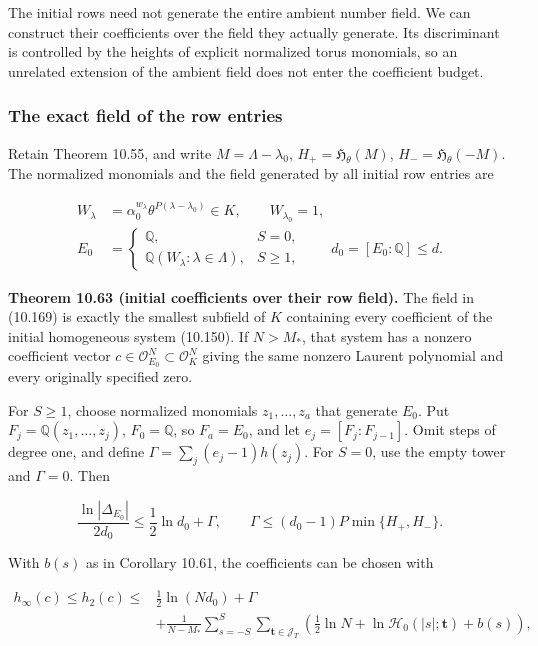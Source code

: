 \documentclass[
  11pt,
  a4paper,
]{article}
\begin{document}
The initial rows need not generate the entire ambient number field. We
can construct their coefficients over the field they actually generate.
Its discriminant is controlled by the heights of explicit normalized
torus monomials, so an unrelated extension of the ambient field does not
enter the coefficient budget.

\subsubsection{The exact field of the row
entries}\label{the-exact-field-of-the-row-entries}

Retain Theorem 10.55, and write \(M=\Lambda-\lambda_0\),
\(H_+=\mathfrak H_\theta(M)\), \(H_-=\mathfrak H_\theta(-M)\). The
normalized monomials and the field generated by all initial row entries
are

\[
\begin{aligned}
W_\lambda&=\alpha_0^{w_\lambda}\theta^{P(\lambda-\lambda_0)}
\in K,\qquad W_{\lambda_0}=1,\\
E_0&=\begin{cases}
\mathbb Q,&S=0,\\
\mathbb Q(W_\lambda:\lambda\in\Lambda),&S\ge1,
\end{cases}
\qquad d_0=[E_0:\mathbb Q]\le d.
\end{aligned}
\tag{10.169}
\]

\textbf{Theorem 10.63 (initial coefficients over their row field).} The
field in (10.169) is exactly the smallest subfield of \(K\) containing
every coefficient of the initial homogeneous system (10.150). If
\(N>M_*\), that system has a nonzero coefficient vector
\(c\in\mathcal O_{E_0}^N\subset\mathcal O_K^N\) giving the same nonzero
Laurent polynomial and every originally specified zero.

For \(S\ge1\), choose normalized monomials \(z_1,\ldots,z_a\) that
generate \(E_0\). Put \(F_j=\mathbb Q(z_1,\ldots,z_j)\),
\(F_0=\mathbb Q\), so \(F_a=E_0\), and let \(e_j=[F_j:F_{j-1}]\). Omit
steps of degree one, and define \(\Gamma=\sum_j(e_j-1)h(z_j)\). For
\(S=0\), use the empty tower and \(\Gamma=0\). Then

\[
\frac{\ln|\Delta_{E_0}|}{2d_0}
\le\frac12\ln d_0+\Gamma,\qquad
\Gamma\le(d_0-1)P\min\{H_+,H_-\}.
\tag{10.170}
\]

With \(b(s)\) as in Corollary 10.61, the coefficients can be chosen with

\[
\begin{aligned}
h_\infty(c)\le h_2(c)\le&
\frac12\ln(Nd_0)+\Gamma\\
&+\frac1{N-M_*}\sum_{s=-S}^S
\sum_{\boldsymbol t\in\mathcal J_T}
\left(\frac12\ln N+\ln\mathcal H_0(|s|;\boldsymbol t)+b(s)\right),
\end{aligned}
\tag{10.171}
\]
\end{document}

